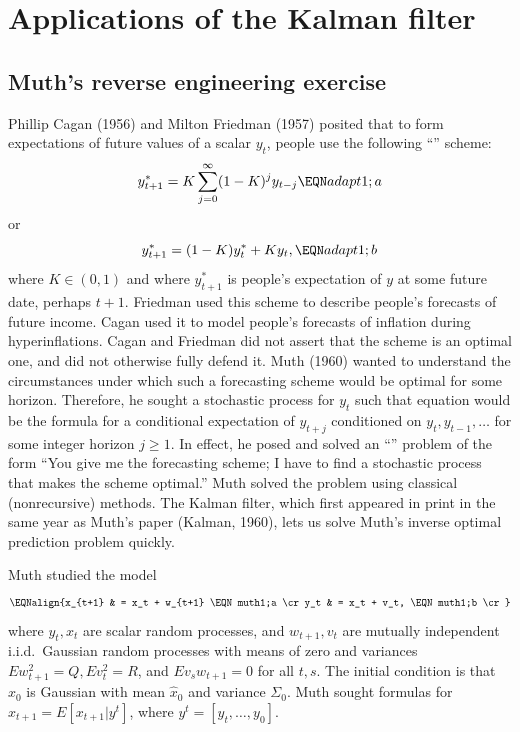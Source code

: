 \vfil\eject

\section{Applications  of the Kalman filter}\label{Kfilterapplications}%
\subsection{Muth's reverse engineering exercise}\label{sec:Muth_reverse}%
  Phillip Cagan  (1956) and Milton Friedman  (1957)
posited that to form
expectations of future values of a
scalar $y_t$, people use the following ``''
scheme:
$$ y_{t+1}^* = K \sum_{j=0}^\infty (1-K)^j y_{t-j} \EQN adapt1;a $$
or
$$ y_{t+1}^*  = (1-K) y_t^* + K y_t , \EQN adapt1;b$$
where $K \in (0,1)$ and where $y_{t+1}^*$ is people's expectation of $y$ at some future date, perhaps $t+1$.    Friedman
used this scheme to describe people's forecasts of future
income.  Cagan used it to model people's forecasts of inflation
during hyperinflations. Cagan and Friedman did not assert that
the scheme is an optimal one, and did not otherwise fully defend it.
Muth (1960) wanted to understand the circumstances under which
such a  forecasting  scheme  would be optimal for some horizon.  Therefore,
he sought a stochastic process for $y_t$ such that equation 
would be the formula for a conditional expectation of $y_{t+j}$ conditioned on $y_t, y_{t-1}, \ldots$
for some integer horizon $j \geq 1$.    In effect, he posed and solved an
``'' problem of the form  ``You give me
the forecasting scheme; I have to find a stochastic process
that makes the scheme optimal.''
Muth solved the problem using classical (nonrecursive) methods.
    The Kalman
filter, which  first appeared  in print in the same year as Muth's  paper (Kalman, 1960),  lets  us solve Muth's inverse optimal prediction
problem quickly.
%
%
%
%
%
%

Muth studied the model
$$\EQNalign{x_{t+1} & = x_t + w_{t+1} \EQN muth1;a \cr
            y_t & = x_t + v_t, \EQN muth1;b \cr}$$
where  $y_t, x_t$ are scalar random processes,
and $w_{t+1}, v_t$ are mutually independent
i.i.d.~Gaussian random processes with means of zero and
variances $E w_{t+1}^2 = Q, E v_t^2 =R$, and  $Ev_s w_{t+1} = 0$
for all $t,s$.  The initial condition
is that $x_0$ is Gaussian with mean $\hat x_0$ and
variance $\Sigma_0$. Muth sought formulas for
$\hat x_{t+1} = E [x_{t+1} \vert y^t]$, where
$y^t = [y_t, \ldots, y_0]$.


